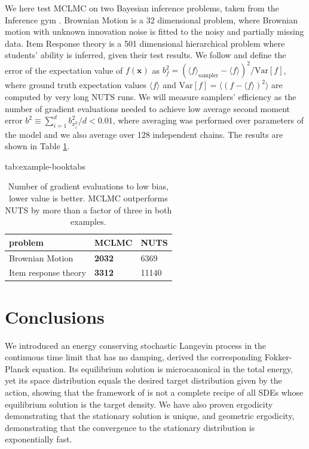 \documentclass[tablecaption=bottom,wcp]{jmlr} %
\newcommand{\x}{\boldsymbol{x}}
\newcommand{\changefont}[1]{{\fontfamily{qcr}\selectfont#1}}
\begin{document}
We here test MCLMC on two Bayesian inference problems, taken from the Inference gym \citep{inferencegym}.
Brownian Motion %
is a 32 dimensional problem, where Brownian motion with unknown innovation noise is fitted to the noisy and partially missing data. 
Item Response theory 
is a 501 dimensional hierarchical problem where students' ability is inferred, given their test results.
We follow \cite{meads} and define the error of the expectation value of $f(\x)$ as
$b^2_{f}= (\langle f \rangle_{\mathrm{sampler}} - \langle f \rangle)^2 / \mathrm{Var}[f]$,
where ground truth expectation values $\langle f \rangle$ and $\mathrm{Var}[f] = \langle (f - \langle f \rangle)^2\rangle$ are computed by very long NUTS runs. 
We will measure samplers' efficiency as the number of gradient evaluations needed to achieve low average second moment error $b^2 \equiv \sum_{i = 1}^{d} b^2_{x_i^2} / d < 0.01$, where averaging was performed over parameters of the model and we also average over 128 independent chains. The results are shown in Table \ref{table}.


\begin{table}[hbtp]
\floatconts 
  {tab:example-booktabs}
  {\caption{Number of gradient evaluations to low bias, lower value is better. MCLMC outperforms NUTS by more than a factor of three in both examples.}}
  {\begin{tabular}{lll} 
  \toprule
  \bfseries problem & \bfseries MCLMC & \bfseries NUTS \\
  \midrule
  Brownian Motion & {\bf 2032} & 6369\\
  Item response theory & {\bf 3312} & 11140\\
  \bottomrule
  \end{tabular}} \label{table}
\end{table}




\section{Conclusions}
We introduced an energy conserving 
stochastic Langevin process in the continuous time limit that 
has no damping, derived the 
corresponding Fokker-Planck equation. Its equilibrium solution is microcanonical in the total energy, yet its space distribution equals the desired target 
distribution given by the action, showing that 
the framework of \cite{Ma15} is not 
a complete recipe of all SDEs whose equilibrium solution is the target density. We have also proven ergodicity 
demonstrating that the stationary solution 
is unique, and geometric ergodicity,  
demonstrating that the convergence to the stationary distribution is exponentially 
fast. 
\end{document}
